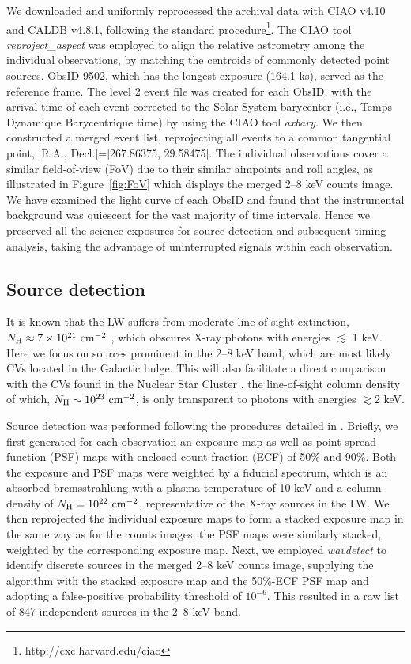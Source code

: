 \documentclass[fleqn,usenatbib]{mnras}
\begin{document}
We downloaded and uniformly reprocessed the archival data with CIAO v4.10 and CALDB v4.8.1, following the standard procedure\footnote{http://cxc.harvard.edu/ciao}.
The CIAO tool \emph{reproject\_aspect} was employed to align the relative astrometry among the individual observations, by matching the centroids of commonly detected point sources. ObsID 9502, which has the longest exposure (164.1 ks), served as the reference frame.
The level 2 event file was created for each ObsID, with the arrival time of each event corrected to the Solar System barycenter (i.e., Temps Dynamique Barycentrique time) by using the CIAO tool \emph{axbary}.
We then constructed a merged event list, reprojecting all events to a common tangential point, [R.A., Decl.]=[267.86375, 29.58475].
The individual observations cover a similar field-of-view (FoV) due to their similar aimpoints and roll angles, as illustrated in Figure~\ref{fig:FoV} which displays the merged 2--8 keV counts image.
We have examined the light curve of each ObsID and found that the instrumental background was quiescent for the vast majority of time intervals.
Hence we preserved all the science exposures for source detection and subsequent timing analysis, taking the advantage of uninterrupted signals within each observation.  

\subsection{Source detection}\label{subsec:detect}
It is known that the LW suffers from moderate line-of-sight extinction, $N_{\rm H} \approx 7\times10^{21}{\rm~cm^{-2}}$ \citep{2011MNRAS.414..495R}, which obscures X-ray photons with energies $\lesssim$ 1 keV.
Here we focus on sources prominent in the 2--8 keV band, which are most likely CVs located in the Galactic bulge. This will also facilitate a direct comparison with the CVs found in the Nuclear Star Cluster \citep{2018ApJS..235...26Z}, the line-of-sight column density of which, $N_{\rm H} \sim 10^{23}{\rm~cm^{-2}}$, is only transparent to photons with energies $\gtrsim$2 keV. 

Source detection was performed following the procedures detailed in \citet{2018ApJS..235...26Z}.
Briefly, we first generated for each observation an exposure map as well as point-spread function (PSF) maps with enclosed count fraction (ECF) of 50\% and 90\%. 
Both the exposure and PSF maps were weighted by a fiducial spectrum, which is an absorbed bremsstrahlung with a plasma temperature of 10 keV and a column density of $N_{\rm H}=10^{22}{\rm~cm^{-2}}$, representative of the X-ray sources in the LW. 
We then reprojected the individual exposure maps to form a stacked exposure map in the same way as for the counts images; the PSF maps were similarly stacked, weighted by the corresponding exposure map. 
Next, we employed {\it wavdetect} to identify discrete sources in the merged 2--8 keV counts image, supplying the algorithm with the stacked exposure map and the 50\%-ECF PSF map and adopting a false-positive probability threshold of $10^{-6}$. 
This resulted in a raw list of 847 independent sources in the 2--8 keV band. 
\end{document}
